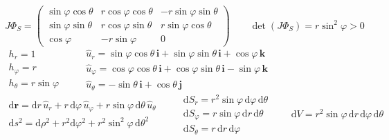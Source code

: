 \documentclass[10pt,landscape]{article}
\begin{document}
\begin{multicols*}{2}
$J\Phi_S=\left(\begin{matrix}\sin\varphi\cos\theta&r\cos\varphi\cos\theta&-r\sin\varphi\sin\theta\\\sin\varphi\sin\theta&r\cos\varphi\sin\theta&r\sin\varphi\cos\theta\\\cos\varphi&-r\sin\varphi&0\end{matrix}\right)\qquad\det(J\Phi_S)=r\sin^2\varphi>0$\\
$\begin{array}{l}h_r=1\\h_\varphi=r\\h_\theta=r\sin\varphi\end{array}\qquad
\begin{array}{l}\hat u_r=\sin\varphi\cos\theta\,\mathbf i+\sin\varphi\sin\theta\,\mathbf i+\cos\varphi\,\mathbf k\\\hat u_\varphi=\cos\varphi\cos\theta\,\mathbf i+\cos\varphi\sin\theta\,\mathbf i-\sin\varphi\,\mathbf k\\\hat u_\theta=-\sin\theta\,\mathbf i+\cos\theta\,\mathbf j\end{array}$\\
$\begin{array}{l}\mathrm{d}\mathbf r=\mathrm{d}r\,\hat u_r+r\,\mathrm{d}\varphi\,\hat u_\varphi+r\sin\varphi\,\mathrm{d}\theta\,\hat u_\theta\\
\mathrm{d}s^2=\mathrm{d}\rho^2+r^2\mathrm{d}\varphi^2+r^2\sin^2\varphi\,\mathrm{d}\theta^2\end{array}\qquad
\begin{array}{l}\mathrm{d}S_r=r^2\sin\varphi\,\mathrm{d}\varphi\,\mathrm{d}\theta\\\mathrm{d}S_\varphi=r\sin\varphi\,\mathrm{d}r\,\mathrm{d}\theta\\\mathrm{d}S_\theta=r\,\mathrm{d}r\,\mathrm{d}\varphi\end{array}\qquad
\mathrm{d}V=r^2\sin\varphi\,\mathrm{d}r\,\mathrm{d}\varphi\,\mathrm{d}\theta$
\vfill\null\columnbreak


\end{multicols*}
\end{document}
